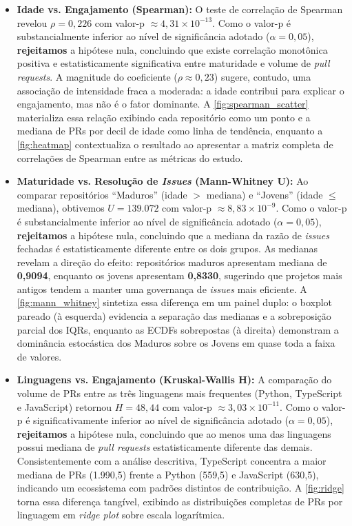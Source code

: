 \documentclass[
	article,			%
	11pt,				%
	oneside,			%
	a4paper,			%
	english,			%
	brazil,				%
	sumario=tradicional
	]{abntex2}
\begin{document}
\begin{itemize}
    \item \textbf{Idade vs. Engajamento (Spearman):} O teste de correlação de Spearman revelou $\rho = 0{,}226$ com valor-p $\approx 4{,}31 \times 10^{-13}$. Como o valor-p é substancialmente inferior ao nível de significância adotado ($\alpha = 0{,}05$), \textbf{rejeitamos} a hipótese nula, concluindo que existe correlação monotônica positiva e estatisticamente significativa entre maturidade e volume de \textit{pull requests}. A magnitude do coeficiente ($\rho \approx 0{,}23$) sugere, contudo, uma associação de intensidade fraca a moderada: a idade contribui para explicar o engajamento, mas não é o fator dominante. A \autoref{fig:spearman_scatter} materializa essa relação exibindo cada repositório como um ponto e a mediana de PRs por decil de idade como linha de tendência, enquanto a \autoref{fig:heatmap} contextualiza o resultado ao apresentar a matriz completa de correlações de Spearman entre as métricas do estudo.
    
    \item \textbf{Maturidade vs. Resolução de \textit{Issues} (Mann-Whitney U):} Ao comparar repositórios ``Maduros'' (idade $>$ mediana) e ``Jovens'' (idade $\le$ mediana), obtivemos $U = 139.072$ com valor-p $\approx 8{,}83 \times 10^{-9}$. Como o valor-p é substancialmente inferior ao nível de significância adotado ($\alpha = 0{,}05$), \textbf{rejeitamos} a hipótese nula, concluindo que a mediana da razão de \textit{issues} fechadas é estatisticamente diferente entre os dois grupos. As medianas revelam a direção do efeito: repositórios maduros apresentam mediana de \textbf{0,9094}, enquanto os jovens apresentam \textbf{0,8330}, sugerindo que projetos mais antigos tendem a manter uma governança de \textit{issues} mais eficiente. A \autoref{fig:mann_whitney} sintetiza essa diferença em um painel duplo: o boxplot pareado (à esquerda) evidencia a separação das medianas e a sobreposição parcial dos IQRs, enquanto as ECDFs sobrepostas (à direita) demonstram a dominância estocástica dos Maduros sobre os Jovens em quase toda a faixa de valores.
    
    \item \textbf{Linguagens vs. Engajamento (Kruskal-Wallis H):} A comparação do volume de PRs entre as três linguagens mais frequentes (Python, TypeScript e JavaScript) retornou $H = 48{,}44$ com valor-p $\approx 3{,}03 \times 10^{-11}$. Como o valor-p é significativamente inferior ao nível de significância adotado ($\alpha = 0{,}05$), \textbf{rejeitamos} a hipótese nula, concluindo que ao menos uma das linguagens possui mediana de \textit{pull requests} estatisticamente diferente das demais. Consistentemente com a análise descritiva, TypeScript concentra a maior mediana de PRs (1.990,5) frente a Python (559,5) e JavaScript (630,5), indicando um ecossistema com padrões distintos de contribuição. A \autoref{fig:ridge} torna essa diferença tangível, exibindo as distribuições completas de PRs por linguagem em \textit{ridge plot} sobre escala logarítmica.
\end{itemize}
\end{document}
